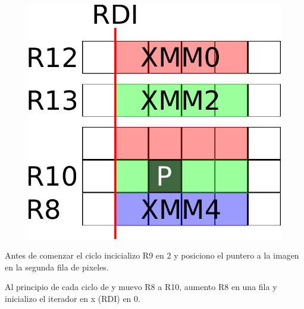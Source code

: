 \begin{figure}[h!]
	\centering
	\includegraphics[scale=0.5]{images/BlurASM1_0}
\end{figure}

Antes de comenzar el ciclo incicializo R9 en 2 y posiciono el puntero a la imagen en la segunda fila de pixeles.

Al principio de cada ciclo de y muevo R8 a R10, aumento R8 en una fila y inicializo el iterador en x (RDI) en 0.

